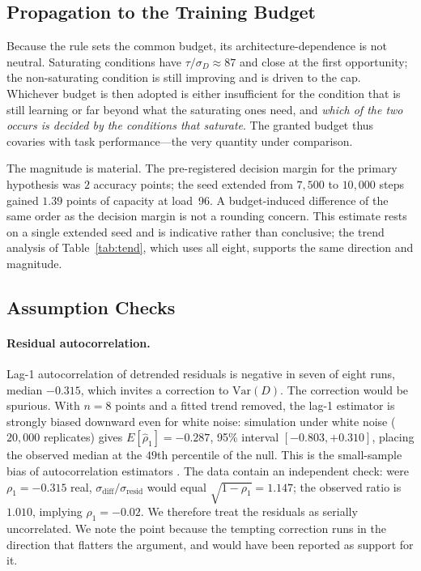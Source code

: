 \documentclass[jou,11pt,donotrepeattitle]{apa7}
\begin{document}
\subsection{Propagation to the Training Budget}

Because the rule sets the common budget, its architecture-dependence is not neutral. Saturating
conditions have $\tau/\sigma_D \approx 87$ and close at the first opportunity; the non-saturating
condition is still improving and is driven to the cap. Whichever budget is then adopted is
either insufficient for the condition that is still learning or far beyond what the saturating
ones need, and \emph{which of the two occurs is decided by the conditions that saturate}. The
granted budget thus covaries with task performance---the very quantity under comparison.

The magnitude is material. The pre-registered decision margin for the primary hypothesis was
$2$ accuracy points; the seed extended from $7{,}500$ to $10{,}000$ steps gained $1.39$ points of
capacity at load~96. A budget-induced difference of the same order as the decision margin is not
a rounding concern. This estimate rests on a single extended seed and is indicative rather than
conclusive; the trend analysis of Table~\ref{tab:tend}, which uses all eight, supports the same
direction and magnitude.

\subsection{Assumption Checks}
\label{sec:assump}

\paragraph{Residual autocorrelation.} Lag-1 autocorrelation of detrended residuals is negative
in seven of eight runs, median $-0.315$, which invites a correction to $\mathrm{Var}(D)$. The
correction would be spurious. With $n = 8$ points and a fitted trend removed, the lag-1 estimator
is strongly biased downward even for white noise: simulation under white noise ($20{,}000$
replicates) gives $E[\hat\rho_1] = -0.287$, 95\% interval $[-0.803, +0.310]$, placing the
observed median at the $49$th percentile of the null. This is the small-sample bias of
autocorrelation estimators \parencite{marriott1954bias}. The data contain an independent check:
were $\rho_1 = -0.315$ real, $\sigma_{\text{diff}}/\sigma_{\text{resid}}$ would equal
$\sqrt{1-\rho_1} = 1.147$; the observed ratio is $1.010$, implying $\rho_1 = -0.02$. We therefore
treat the residuals as serially uncorrelated. We note the point because the tempting
correction runs in the direction that flatters the argument, and would have been reported as
support for it.
\end{document}
